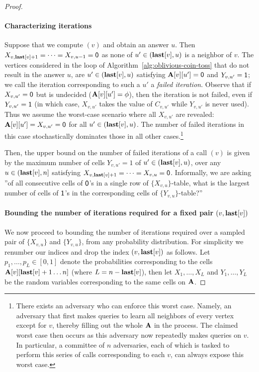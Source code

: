 \begin{proof}
\paragraph*{Characterizing iterations}
Suppose that we compute $(v)$ and obtain an answer $u$. Then $X_{v,\mathbf{last}[v]+1} = \cdots = X_{v, u-1} = \mathsf{0}$ as none of $u' \in (\mathbf{last}[v], u)$ is a neighbor of $v$. The vertices considered in the loop of Algorithm~\ref{alg:oblivious-coin-toss} that do not result in the answer $u$, are $u' \in (\mathbf{last}[v], u)$ satisfying $\mathbf{A}[v][u'] = \mathsf{0}$ and $Y_{v,u'} = \mathsf{1}$; we call the iteration corresponding to such a $u'$ a \emph{failed iteration}. Observe that if $X_{v,u'} = \mathsf{0}$ but is undecided ($\mathbf{A}[v][u'] = \phi$), then the iteration is not failed, even if $Y_{v,u'} = \mathsf{1}$ (in which case, $X_{v,u'}$ takes the value of $C_{v,u'}$ while $Y_{v,u'}$ is never used). Thus we assume the worst-case scenario where all $X_{v,u'}$ are revealed: $\mathbf{A}[v][u']=X_{v,u'}=\mathsf{0}$ for all $u'\in(\mathbf{last}[v], u)$. The number of failed iterations in this case stochastically dominates those in all other cases.\footnote{There exists an adversary who can enforce this worst case. Namely, an adversary that first makes  queries to learn all neighbors of every vertex except for $v$, thereby filling out the whole $\mathbf{A}$ in the process. The claimed worst case then occurs as this adversary now repeatedly makes  queries on $v$. In particular, a committee of $n$ adversaries, each of which is tasked to perform this series of calls corresponding to each $v$, can always expose this worst case.}

Then, the upper bound on the number of failed iterations of a call $(v)$ is given by the maximum number of cells $Y_{v, u'} = 1$ of $u' \in(\mathbf{last}[v], u)$, over any $u \in(\mathbf{last}[v], n]$ satisfying $X_{v,\mathbf{last}[v]+1} = \cdots = X_{v,u} = \mathsf{0}$. Informally, we are asking ''of all consecutive cells of $\mathsf{0}$'s in a single row of $\{X_{v,u}\}$-table, what is the largest number of cells of $\mathsf{1}$'s in the corresponding cells of $\{Y_{v,u}\}$-table?''

\paragraph*{Bounding the number of iterations required for a fixed pair $(v, \mathbf{last}[v])$}
We now proceed to bounding the number of iterations required over a sampled pair of $\{X_{v,u}\}$ and $\{Y_{v,u}\}$, from any probability distribution. For simplicity we renumber our indices and drop the index $(v,\mathbf{last}[v])$ as follows. Let $p_1, \ldots, p_L \in [0, 1]$ denote the probabilities corresponding to the cells $\mathbf{A}[v][\mathbf{last}[v]+1 \ldots n]$ (where $L = n-\mathbf{last}[v]$), then let $X_1, \ldots, X_L$ and $Y_1, \ldots, Y_L$ be the random variables corresponding to the same cells on $\mathbf{A}$.


\end{proof}

